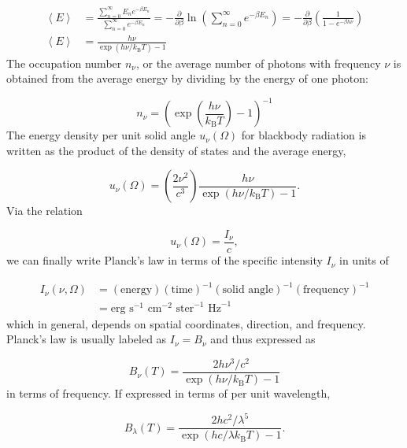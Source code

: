 \documentclass[12pt]{article}
\newcommand{\pderiv}[2]{\frac{\partial #1}{\partial #2}}
\newcommand{\bigparenthesis}[1]{\left(#1\right)}
\begin{document}
\begin{align}
    \left< E \right> &= \frac{\sum_{n=0}^{\infty}E_n e^{-\beta E_n}}{\sum_{n=0}^{\infty}e^{-\beta E_n}} = -\pderiv{}{\beta} \ln \bigparenthesis{\sum_{n=0}^{\infty}e^{-\beta E_n}} = - \pderiv{}{\beta}\bigparenthesis{\frac{1}{1-e^{-\beta h \nu}}} \\
    \left< E \right> &= \frac{h\nu}{\exp\bigparenthesis{h\nu/k_\mathrm{B}T}-1}
\end{align}
%
The occupation number $n_\nu$, or the average number of photons with frequency $\nu$ is obtained from the average energy by dividing by the energy of one photon:

\begin{equation}
    n_\nu = \bigparenthesis{\exp \bigparenthesis{\frac{h\nu}{k_\mathrm{B}T}}-1}^{-1}
\end{equation}
%
The energy density per unit solid angle $u_\nu(\Omega)$ for blackbody radiation is written as the product of the density of states and the average energy,

\begin{equation}
    u_\nu(\Omega) = \bigparenthesis{\frac{2\nu^2}{c^3}} \frac{h\nu}{\exp\bigparenthesis{h\nu/k_\mathrm{B}T}-1}.
\end{equation}
%
Via the relation

\begin{equation}
    u_\nu(\Omega) = \frac{I_\nu}{c},
\end{equation}
%
we can finally write Planck's law in terms of the specific intensity $I_\nu$ in units of

\begin{align}
    I_\nu (\nu,\Omega) &= (\text{energy}) (\text{time})^{-1} (\text{solid angle})^{-1} (\text{frequency})^{-1} \\
    &= \text{erg} \text{ s}^{-1} \text{ cm}^{-2} \text{ ster}^{-1} \text{ Hz}^{-1}
\end{align}
%
which in general, depends on spatial coordinates, direction, and frequency. Planck's law is usually labeled as $I_\nu = B_\nu$ and thus expressed as

\begin{equation}
B_\nu (T) = \frac{2h\nu^3/c^2}{\exp\bigparenthesis{h\nu/k_\mathrm{B}T}-1}    
\end{equation}
%
in terms of frequency. If expressed in terms of per unit wavelength,

\begin{equation}
B_\lambda (T) = \frac{2hc^2/\lambda^5}{\exp\bigparenthesis{hc/\lambda k_\mathrm{B}T}-1} .
\end{equation}
\end{document}
